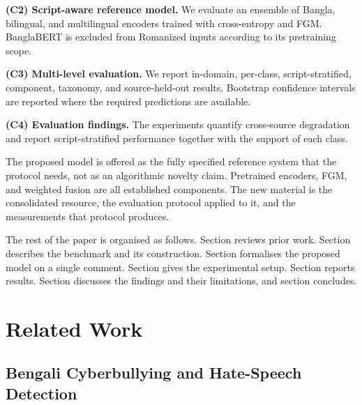 \documentclass[11pt,a4paper]{article}
\def\Cref#1{Section}%
\def\cref#1{section}%
\begin{document}
\textbf{(C2) Script-aware reference model.} We evaluate an ensemble of Bangla, bilingual, and multilingual encoders trained with cross-entropy and FGM. BanglaBERT is excluded from Romanized inputs according to its pretraining scope.

\textbf{(C3) Multi-level evaluation.} We report in-domain, per-class, script-stratified, component, taxonomy, and source-held-out results. Bootstrap confidence intervals are reported where the required predictions are available.

\textbf{(C4) Evaluation findings.} The experiments quantify cross-source degradation and report script-stratified performance together with the support of each class.

The proposed model is offered as the fully specified reference system that the protocol needs, not as an algorithmic novelty claim. Pretrained encoders, FGM, and weighted fusion are all established components. The new material is the consolidated resource, the evaluation protocol applied to it, and the measurements that protocol produces.

The rest of the paper is organised as follows. \Cref{sec:related-work} reviews prior work. \Cref{sec:benchmark} describes the benchmark and its construction. \Cref{sec:methodology} formalises the proposed model on a single comment. \Cref{sec:setup} gives the experimental setup. \Cref{sec:results} reports results. \Cref{sec:discussion} discusses the findings and their limitations, and \cref{sec:conclusion} concludes.

\section{Related Work}
\label{sec:related-work}

\subsection{Bengali Cyberbullying and Hate-Speech Detection}
\label{sec:rw-bengali}
\end{document}
